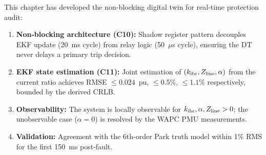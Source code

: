 This chapter has developed the non-blocking digital twin for real-time
protection audit:
\begin{enumerate}
\item \textbf{Non-blocking architecture (C10):} Shadow register pattern
      decouples EKF update (20~ms cycle) from relay logic (50~$\mu$s cycle),
      ensuring the DT never delays a primary trip decision.
\item \textbf{EKF state estimation (C11):} Joint estimation of
      $(k_\mathrm{ibr}, Z_\mathrm{line}, \alpha)$ from the current ratio achieves
      RMSE $\leq 0.024$~pu, $\leq 0.5\%$, $\leq 1.1\%$ respectively,
      bounded by the derived CRLB.
\item \textbf{Observability:} The system is locally observable for
      $k_\mathrm{ibr}, \alpha, Z_\mathrm{line} > 0$; the unobservable case
      ($\alpha = 0$) is resolved by the WAPC PMU measurements.
\item \textbf{Validation:} Agreement with the 6th-order Park truth model
      within 1\% RMS for the first 150~ms post-fault.
\end{enumerate}
